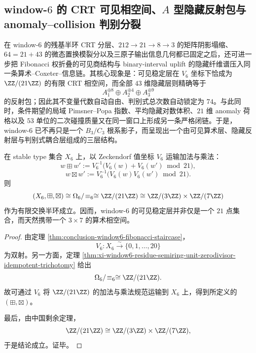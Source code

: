 \subsection{window-\texorpdfstring{$6$}{6} 的 CRT 可见相空间、\texorpdfstring{$A$}{A} 型隐藏反射包与 anomaly--collision 判别分裂}\label{subsec:conclusion-window6-crt-weyl-discriminant-anomaly-collision}

在 window-\(6\) 的残基半环 CRT 分层、\(212\to 21\to 8\to 3\) 的矩阵阴影塌缩、\(64=21+43\) 的微态置换模裂分以及三原子输出信息几何都已固定之后，还可进一步把 Fibonacci 权折叠的可见商结构与 binary-interval uplift 的隐藏纤维谱压入同一条算术--Coxeter--信息链。其核心现象是：可见稳定层在 \(V_6\) 坐标下恰成为 \(\ZZ/(21\ZZ)\) 的有限 CRT 相空间，而全部 \(43\) 维隐藏层则精确等于
\[
A_1^{\oplus 8}\oplus A_2^{\oplus 4}\oplus A_3^{\oplus 9}
\]
的反射包；因此其不变量代数自动自由、判别式总次数自动锁定为 \(74\)。与此同时，条件期望的局域 Pimsner--Popa 指数、平均隐藏对数体积、\(21\) 维 anomaly 荷格以及 \(53\) 单位的二次碰撞质量又在同一窗口上形成另一条严格闭链。于是，window-\(6\) 已不再只是一个 \(B_3/C_3\) 根系影子，而呈现出一个由可见算术层、隐藏反射层与判别式耦合层组成的三层结构。

\begin{theorem}\label{thm:conclusion-window6-visible-crt-arithmetic-phase-space}
在 stable type 集合 \(X_6\) 上，以 Zeckendorf 值坐标 \(V_6\) 运输加法与乘法：
\[
w\boxplus w'
:=
V_6^{-1}\!\bigl(V_6(w)+V_6(w')\bmod 21\bigr),
\]
\[
w\boxtimes w'
:=
V_6^{-1}\!\bigl(V_6(w)V_6(w')\bmod 21\bigr).
\]
则
\[
(X_6,\boxplus,\boxtimes)
\cong
\Omega_6/\!\equiv_6
\cong
\ZZ/(21\ZZ)
\cong
\ZZ/(3\ZZ)\times \ZZ/(7\ZZ)
\]
作为有限交换半环成立。因而，window-\(6\) 的可见稳定层并非仅是一个 \(21\) 点集合，而天然携带一个 \(3\times 7\) 的算术相空间。
\end{theorem}
\begin{proof}
由定理 \ref{thm:conclusion-window6-fibonacci-staircase}，
\[
V_6:X_6\overset{\sim}{\longrightarrow}\{0,1,\dots,20\}
\]
为双射。另一方面，定理 \ref{thm:xi-window6-residue-semiring-unit-zerodivisor-idempotent-trichotomy} 给出
\[
\Omega_6/\!\equiv_6\cong \ZZ/(21\ZZ).
\]
故可通过 \(V_6\) 将 \(\ZZ/(21\ZZ)\) 的加法与乘法规范运输到 \(X_6\) 上，得到所定义的 \((\boxplus,\boxtimes)\)。

最后，由中国剩余定理，
\[
\ZZ/(21\ZZ)\cong \ZZ/(3\ZZ)\times \ZZ/(7\ZZ),
\]
于是结论成立。证毕。
\end{proof}

